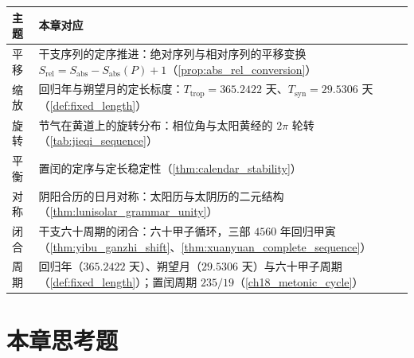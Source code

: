 \begin{center}
\renewcommand{\arraystretch}{1.3}
\begin{tabular}{>{\centering\arraybackslash}p{2.2cm}>{\centering\arraybackslash}p{10.5cm}}
\toprule
主题 & 本章对应 \\
\midrule
平移 & 干支序列的定序推进：绝对序列与相对序列的平移变换 \(S_{\text{rel}}=S_{\text{abs}}-S_{\text{abs}}(P)+1\)（\cref{prop:abs_rel_conversion}） \\
缩放 & 回归年与朔望月的定长标度：\(T_{\text{trop}}=365.2422\) 天、\(T_{\text{syn}}=29.5306\) 天（\cref{def:fixed_length}） \\
旋转 & 节气在黄道上的旋转分布：相位角与太阳黄经的 \(2\pi\) 轮转（\cref{tab:jieqi_sequence}） \\
平衡 & 置闰的定序与定长稳定性（\cref{thm:calendar_stability}） \\
对称 & 阴阳合历的日月对称：太阳历与太阴历的二元结构（\cref{thm:lunisolar_grammar_unity}） \\
闭合 & 干支六十周期的闭合：六十甲子循环，三部 \(4560\) 年回归甲寅（\cref{thm:yibu_ganzhi_shift}、\cref{thm:xuanyuan_complete_sequence}） \\
周期 & 回归年（\(365.2422\) 天）、朔望月（\(29.5306\) 天）与六十甲子周期（\cref{def:fixed_length}）；置闰周期 \(235/19\)（\cref{ch18_metonic_cycle}） \\
\bottomrule
\end{tabular}
\end{center}

\section*{本章思考题}

